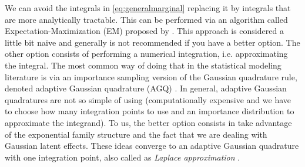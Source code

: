 We can avoid the integrals in \autoref{eq:generalmarginal} replacing it
by integrals that are more analytically tractable. This can be performed
via an algorithm called Expectation-Maximization (EM) proposed by
. This approach is considered a little bit naive and
generally is not recommended if you have a better option. The other
option consists of performing a numerical integration, i.e.
approximating the integral. The most common way of doing that in the
statistical modeling literature is via an importance sampling version of
the Gaussian quadrature rule, denoted adaptive Gaussian quadrature (AGQ)
\cite{quadrature}. In general, adaptive Gaussian quadratures are not so
simple of using (computationally expensive and we have to choose how
many integration points to use and an importance distribution to
approximate the integrand). To us, the better option consists in take
advantage of the exponential family structure and the fact that we are
dealing with Gaussian latent effects. These ideas converge to an
adaptive Gaussian quadrature with one integration point, also called as
\textit{Laplace approximation} \cite{molenberghs&verbeke, LA4H, tierney,
  corestats}.

